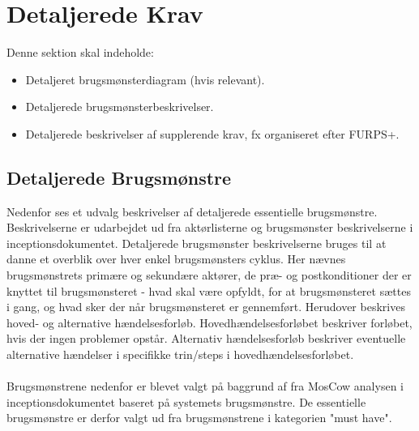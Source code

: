 \section{Detaljerede Krav}
Denne sektion skal indeholde:

\begin{itemize}
    \item Detaljeret brugsmønsterdiagram (hvis relevant).
    \item Detaljerede brugsmønsterbeskrivelser.
    \item Detaljerede beskrivelser af supplerende krav, fx organiseret efter FURPS+.
\end{itemize}{}

\subsection{Detaljerede Brugsmønstre}
Nedenfor ses et udvalg beskrivelser af detaljerede essentielle brugsmønstre. 
Beskrivelserne er udarbejdet ud fra aktørlisterne og brugsmønster beskrivelserne i inceptionsdokumentet. Detaljerede brugsmønster beskrivelserne bruges til at danne et overblik over hver enkel brugsmønsters cyklus. Her nævnes brugsmønstrets primære og sekundære aktører, de præ- og postkonditioner der er knyttet til brugsmønsteret - hvad skal være opfyldt, for at brugsmønsteret sættes i gang, og hvad sker der når brugsmønsteret er gennemført. Herudover beskrives hoved- og alternative hændelsesforløb. Hovedhændelsesforløbet beskriver forløbet, hvis der ingen problemer opstår. Alternativ hændelsesforløb beskriver eventuelle alternative hændelser i specifikke trin/steps i hovedhændelsesforløbet. \\
\\
Brugsmønstrene nedenfor er blevet valgt på baggrund af fra MosCow analysen i inceptionsdokumentet baseret på systemets brugsmønstre. De essentielle brugsmønstre er derfor valgt ud fra brugsmønstrene i kategorien "must have".\\
\\




